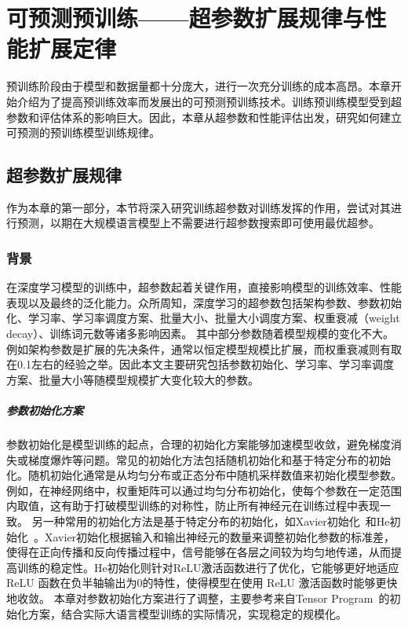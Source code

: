 
\chapter{可预测预训练——超参数扩展规律与性能扩展定律}

预训练阶段由于模型和数据量都十分庞大，进行一次充分训练的成本高昂。本章开始介绍为了提高预训练效率而发展出的可预测预训练技术。训练预训练模型受到超参数和评估体系的影响巨大。因此，本章从超参数和性能评估出发，研究如何建立可预测的预训练模型训练规律。

\section{超参数扩展规律}
作为本章的第一部分，本节将深入研究训练超参数对训练发挥的作用，尝试对其进行预测，以期在大规模语言模型上不需要进行超参数搜索即可使用最优超参。

\subsection{背景}

在深度学习模型的训练中，超参数起着关键作用，直接影响模型的训练效率、性能表现以及最终的泛化能力。众所周知，深度学习的超参数包括架构参数、参数初始化、学习率、学习率调度方案、批量大小、批量大小调度方案、权重衰减（weight decay）、训练词元数等诸多影响因素。
其中部分参数随着模型规模的变化不大。例如架构参数是扩展的先决条件，通常以恒定模型规模比扩展，而权重衰减则有取在0.1左右的经验之举。因此本文主要研究包括参数初始化、学习率、学习率调度方案、批量大小等随模型规模扩大变化较大的参数。

\paragraph{参数初始化方案}
参数初始化是模型训练的起点，合理的初始化方案能够加速模型收敛，避免梯度消失或梯度爆炸等问题。常见的初始化方法包括随机初始化和基于特定分布的初始化。随机初始化通常是从均匀分布或正态分布中随机采样数值来初始化模型参数。例如，在神经网络中，权重矩阵可以通过均匀分布初始化，使每个参数在一定范围内取值，这有助于打破模型训练的对称性，防止所有神经元在训练过程中表现一致。
另一种常用的初始化方法是基于特定分布的初始化，如Xavier初始化~\cite{pmlr-v9-glorot10a}和He初始化~\cite{he2015delving}。Xavier初始化根据输入和输出神经元的数量来调整初始化参数的标准差，使得在正向传播和反向传播过程中，信号能够在各层之间较为均匀地传递，从而提高训练的稳定性。He初始化则针对ReLU激活函数进行了优化，它能够更好地适应 ReLU 函数在负半轴输出为0的特性，使得模型在使用 ReLU 激活函数时能够更快地收敛。
本章对参数初始化方案进行了调整，主要参考来自Tensor Program~\cite{yang2022tensor}的初始化方案，结合实际大语言模型训练的实际情况，实现稳定的规模化。


